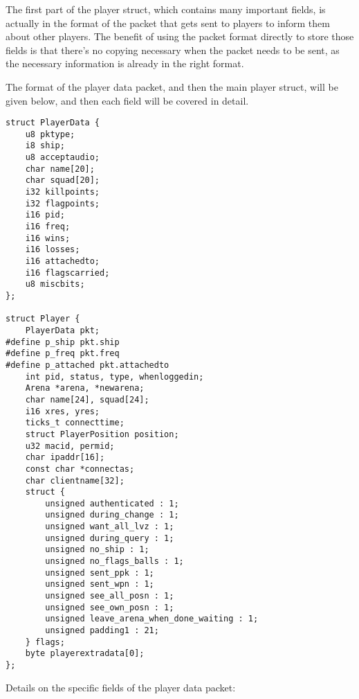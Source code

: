 \documentclass{article}
\begin{document}
The first part of the player struct, which contains many important
fields, is actually in the format of the packet that gets sent to
players to inform them about other players. The benefit of using the
packet format directly to store those fields is that there's no copying
necessary when the packet needs to be sent, as the necessary information
is already in the right format.

The format of the player data packet, and then the main player struct,
will be given below, and then each field will be covered in detail.

\begin{verbatim}
struct PlayerData {
    u8 pktype;
    i8 ship;
    u8 acceptaudio;
    char name[20];
    char squad[20];
    i32 killpoints;
    i32 flagpoints;
    i16 pid;
    i16 freq;
    i16 wins;
    i16 losses;
    i16 attachedto;
    i16 flagscarried;
    u8 miscbits;
};

struct Player {
    PlayerData pkt;
#define p_ship pkt.ship
#define p_freq pkt.freq
#define p_attached pkt.attachedto
    int pid, status, type, whenloggedin;
    Arena *arena, *newarena;
    char name[24], squad[24];
    i16 xres, yres;
    ticks_t connecttime;
    struct PlayerPosition position;
    u32 macid, permid;
    char ipaddr[16];
    const char *connectas;
    char clientname[32];
    struct {
        unsigned authenticated : 1;
        unsigned during_change : 1;
        unsigned want_all_lvz : 1;
        unsigned during_query : 1;
        unsigned no_ship : 1;
        unsigned no_flags_balls : 1;
        unsigned sent_ppk : 1;
        unsigned sent_wpn : 1;
        unsigned see_all_posn : 1;
        unsigned see_own_posn : 1;
        unsigned leave_arena_when_done_waiting : 1;
        unsigned padding1 : 21;
    } flags;
    byte playerextradata[0];
};
\end{verbatim}

Details on the specific fields of the player data packet:
\end{document}

